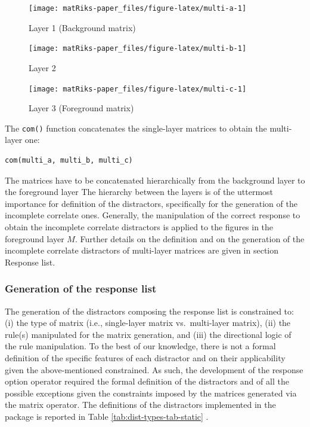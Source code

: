 \begin{figure}
\texttt{[image: matRiks-paper\_files/figure-latex/multi-a-1]} \caption{Layer 1 (Background matrix)}\label{fig:multi-a}
\end{figure}

\begin{figure}
\texttt{[image: matRiks-paper\_files/figure-latex/multi-b-1]} \caption{Layer 2}\label{fig:multi-b}
\end{figure}

\begin{figure}
\texttt{[image: matRiks-paper\_files/figure-latex/multi-c-1]} \caption{Layer 3 (Foreground matrix)}\label{fig:multi-c}
\end{figure}

The \texttt{com()} function concatenates the single-layer matrices to obtain the multi-layer one:

\begin{verbatim}
com(multi_a, multi_b, multi_c)
\end{verbatim}

The matrices have to be concatenated hierarchically from the background layer to the foreground layer
The hierarchy between the layers is of the uttermost importance for definition of the distractors, specifically for the generation of the incomplete correlate ones. Generally, the manipulation of the correct response to obtain the incomplete correlate distractors is applied to the figures in the foreground layer \(M\). Further details on the definition and on the generation of the incomplete correlate distractors of multi-layer matrices are given in section Response list.

\subsubsection{Generation of the response list}\label{generation-of-the-response-list}

The generation of the distractors composing the response list is constrained to: (i) the type of matrix (i.e., single-layer matrix vs.~multi-layer matrix), (ii) the rule(s) manipulated for the matrix generation, and (iii) the directional logic of the rule manipulation.
To the best of our knowledge, there is not a formal definition of the specific features of each distractor and on their applicability given the above-mentioned constrained.
As such, the development of the response option operator required the formal definition of the distractors and of all the possible exceptions given the constraints imposed by the matrices generated via the matrix operator.
The definitions of the distractors implemented in the  package is reported in Table \ref{tab:dist-types-tab-static} .

